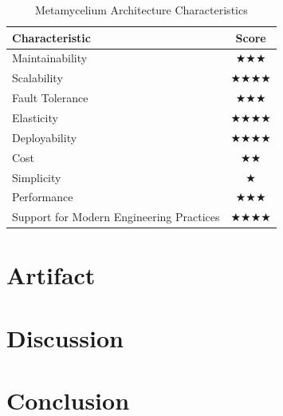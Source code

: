 \documentclass[preprint,12pt]{elsarticle}
\begin{document}
\begin{table}
  \centering
  \caption{Metamycelium Architecture Characteristics}
  \label{tab:architecture-characteristics}
  \begin{tabular}{|l|c|}
    \hline
    \textbf{Characteristic} & \textbf{Score} \\
    \hline
    Maintainability & $\bigstar\bigstar\bigstar$ \\
    \hline
    Scalability & $\bigstar\bigstar\bigstar\bigstar$ \\
    \hline
    Fault Tolerance & $\bigstar\bigstar\bigstar$ \\
    \hline
    Elasticity & $\bigstar\bigstar\bigstar\bigstar$ \\
    \hline
    Deployability & $\bigstar\bigstar\bigstar\bigstar$ \\
    \hline
    Cost & $\bigstar\bigstar$ \\
    \hline
    Simplicity & $\bigstar$ \\
    \hline
    Performance & $\bigstar\bigstar\bigstar$ \\
    \hline
    Support for Modern Engineering Practices & $\bigstar\bigstar\bigstar\bigstar$ \\
    \hline
  \end{tabular}
\end{table}

\section{Artifact}
\label{sec:artifact}

\section{Discussion}
\label{sec:discussion}

\section{Conclusion}
\label{sec:conclusion}




\appendix






\end{document}
